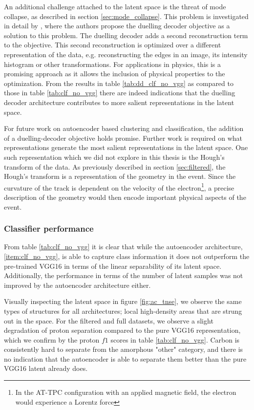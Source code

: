 An additional challenge attached to the latent space is the threat of mode collapse, as described in section \ref{sec:mode_collapse}. This problem is investigated in detail by \citet{Seybold2019}, where the authors propose the duelling decoder objective as a solution to this problem. The duelling decoder adds a second reconstruction term to the objective. This second reconstruction is optimized over a different representation of the data, e.g. reconstructing the edges in an image, its intensity histogram or other transformations. For applications in physics, this is a promising approach as it allows the inclusion of physical properties to the optimization. From the results in table \ref{tab:dd_clf_no_vgg} as compared to those in table \ref{tab:clf_no_vgg} there are indeed indications that the duelling decoder architecture contributes to more salient representations in the latent space. 

For future work on autoencoder based clustering and classification, the addition of a duelling-decoder objective holds promise. Further work is required on what representations generate the most salient representations in the latent space. One such representation which we did not explore in this thesis is the Hough's transform of the data. As previously described in section \ref{sec:filtered}, the Hough's transform is a representation of the geometry in the event. Since the curvature of the track is dependent on the velocity of the electron\footnote{In the AT-TPC configuration with an applied magnetic field, the electron would experience a Lorentz force}, a precise description of the geometry would then encode important physical aspects of the event.


\subsubsection{Classifier performance}

From table \ref{tab:clf_no_vgg} it is clear that while the autoencoder architecture, \ref{item:clf_no_vgg}, is able to capture class information it does not outperform the pre-trained VGG16 in terms of the linear separability of its latent space. Additionally, the performance in terms of the number of latent samples was not improved by the autoencoder architecture either. 

Visually inspecting the latent space in figure \ref{fig:ac_tnse}, we observe the same types of structures for all architectures; local high-density areas that are strung out in the space. For the filtered and full datasets, we observe a slight degradation of proton separation compared to the pure VGG16 representation, which we confirm by the proton $f1$ scores in table \ref{tab:clf_no_vgg}. Carbon is consistently hard to separate from the amorphous "other" category, and there is no indication that the autoencoder is able to separate them better than the pure VGG16 latent already does. 

